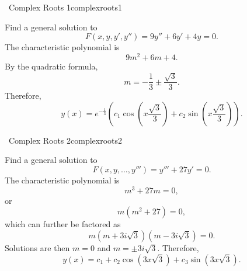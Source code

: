         \begin{example}{\Difficulty\,\Difficulty\,\,Complex Roots 1}{complexroots1}
        
            Find a general solution to
            \begin{equation*}
                F(x,y,y',y'')=9y''+6y'+4y=0.
            \end{equation*}
            The characteristic polynomial is
            \begin{equation*}
                9m^2+6m+4.
            \end{equation*}
            By the quadratic formula,
            \begin{equation*}
                m=-\frac{1}{3}\pm\frac{\sqrt{3}}{3}.
            \end{equation*}
            Therefore,
            \begin{equation*}
                y(x)=e^{-\frac{1}{3}}\left(c_1\cos\left(x\frac{\sqrt{3}}{3}\right)+c_2\sin\left(x\frac{\sqrt{3}}{3}\right)\right).
            \end{equation*}
            
        \end{example}
        \begin{example}{\Difficulty\,\Difficulty\,\,Complex Roots 2}{complexroots2}
        
            Find a general solution to
            \begin{equation*}
                F(x,y,\ldots,y''')=y'''+27y'=0.
            \end{equation*}
            The characteristic polynomial is
            \begin{equation*}
                m^3+27m=0,
            \end{equation*}
            or
            \begin{equation*}
                m(m^2+27)=0,
            \end{equation*}
            which can further be factored as
            \begin{equation*}
                m(m+3i\sqrt{3})(m-3i\sqrt{3})=0.
            \end{equation*}
            Solutions are then \(m=0\) and \(m=\pm3i\sqrt{3}\). Therefore,
            \begin{equation*}
                y(x)=c_1+c_2\cos(3x\sqrt{3})+c_3\sin(3x\sqrt{3}).
            \end{equation*}
        
        \end{example}
